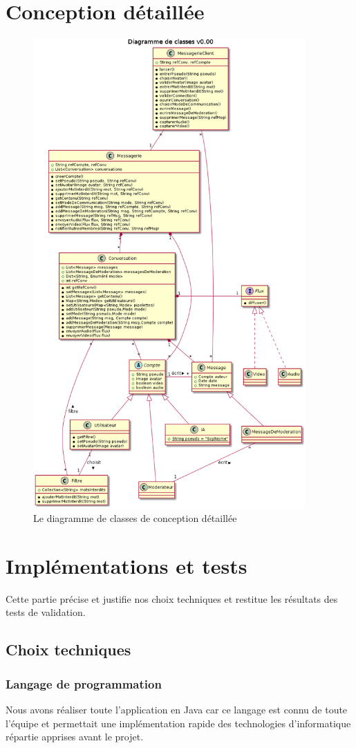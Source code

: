 \documentclass[11pt,dvipsnames,svgnames]{report}
\begin{document}
\chapter{Conception détaillée}
\begin{figure}[H]
\caption{Le diagramme de classes de conception détaillée}
\centerline{\includegraphics[height=18cm]{diagrammes/detailedConception.png}}
\end{figure}
\chapter{Implémentations et tests}
Cette partie précise et justifie nos choix techniques et restitue les résultats des tests de validation.
\section{Choix techniques}
\subsection{Langage de programmation}
Nous avons réaliser toute l'application en Java car ce langage est connu de toute l'équipe et permettait une implémentation rapide des technologies d'informatique répartie apprises avant le projet.
\end{document}
